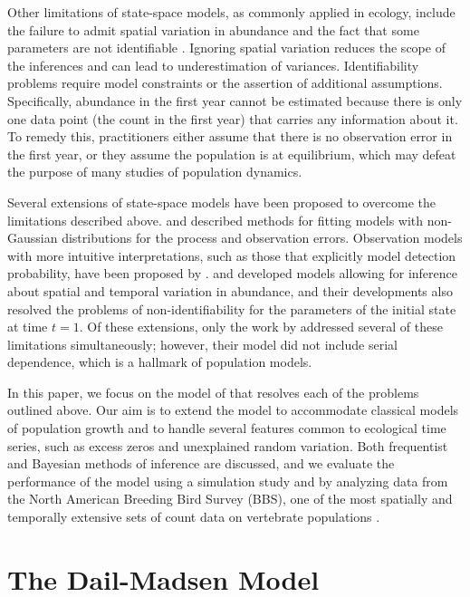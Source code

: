 \documentclass[12pt,english]{article}
\begin{document}
\begin{spacing}{1.9}
\begin{flushleft}
Other limitations of state-space models, as commonly applied in ecology,
include the failure to admit spatial variation in abundance and
the fact that some parameters are not identifiable
\citep{polansky_etal:2009}. 
Ignoring spatial variation reduces the scope of the
inferences and can lead to underestimation of variances. 
Identifiability problems require 
model constraints or the assertion of additional assumptions. 
Specifically, abundance in
the first year cannot be estimated because there is only one data
point (the count in the first year) that carries any information about
it. To remedy this, practitioners either assume that there is no
observation error in the first year, or they assume the population is
at equilibrium, which may defeat the purpose of many studies of
population dynamics. 

Several extensions of state-space models have been proposed to
overcome the limitations described above. \citet{devalpine_hastings:2002} and
\citet{brooks_etal:2004} described methods for fitting models with non-Gaussian
distributions for the process and observation errors. Observation models with
more intuitive interpretations, such as those that explicitly model
detection probability, have been proposed by 
\citet{kery_etal:2009}. \citet{lele_etal:1998} and 
\citet{kery_etal:2009} developed models allowing for inference about
spatial and temporal variation in abundance, and their developments
also resolved the problems of non-identifiability for the parameters
of the initial state at time $t=1$. Of these extensions, only
the work by \citet{kery_etal:2009} addressed several of these limitations
simultaneously; however, their model did not include serial
dependence, which is a hallmark of population models. 

In this paper, we focus on the model of \citet[henceforth the DM model]{dail_madsen:2011}
that resolves each of the problems outlined above. 
Our aim is to extend the
model to accommodate classical models of population growth and
to handle several features common to ecological
time series, such as excess zeros and unexplained random variation. 
Both frequentist and Bayesian methods of inference are discussed, and
we evaluate the performance of the model using a simulation study and by
analyzing data from the North American Breeding Bird Survey (BBS), one of
the most spatially and temporally extensive sets of count data on
vertebrate populations \citep{robbins_etal:1986}.

\section*{The Dail-Madsen Model}
\label{sec:dm}


\end{flushleft}
\end{spacing}
\end{document}

